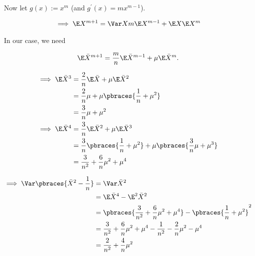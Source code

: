 \begin{solution}
\begin{enumerate}[label = (\alph*)]
    Now let $g(x) := x^m$ (and $g^\prime(x) = m x^{m - 1}$).

    \begin{align*}
        \implies
        \E X^{m + 1}
        =
        \Var X m \E X^{m-1} + \E X \E X^m
    \end{align*}

    In our case, we need

    \begin{align*}
        \E \bar X^{m+1}
        =
        \frac{m}{n} \E \bar X^{m-1} + \mu \E \bar X^m.
    \end{align*}

    \begin{align*}
        \implies
        \E \bar X^3
        & =
        \frac{2}{n} \E \bar X + \mu \E \bar X^2 \\
        & =
        \frac{2}{n} \mu + \mu \pbraces{\frac{1}{n} + \mu^2} \\
        & =
        \frac{3}{n} \mu + \mu^2 \\
        \implies
        \E \bar X^4
        & =
        \frac{3}{n} \E \bar X^2 + \mu \E \bar X^3 \\
        & =
        \frac{3}{n} \pbraces{\frac{1}{n} + \mu^2} + \mu \pbraces{\frac{3}{n} \mu + \mu^3} \\
        & =
        \frac{3}{n^2} + \frac{6}{n} \mu^2 + \mu^4
    \end{align*}

    \begin{align*}
        \implies
        \Var \pbraces{\bar X^2 - \frac{1}{n}}
        & =
        \Var \bar X^2 \\
        & =
        \E \bar X^4 - \E^2 \bar X^2 \\
        & =
        \pbraces
        {
            \frac{3}{n^2} + \frac{6}{n} \mu^2 + \mu^4
        }
        -
        \pbraces
        {
            \frac{1}{n} + \mu^2
        }^2 \\
        & =
        \frac{3}{n^2} + \frac{6}{n} \mu^2 + \mu^4 - \frac{1}{n^2} - \frac{2}{n} \mu^2 - \mu^4 \\
        & =
        \frac{2}{n^2} + \frac{4}{n} \mu^2
    \end{align*}


\end{enumerate}
\end{solution}
